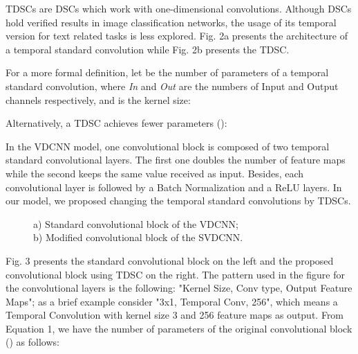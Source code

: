 \documentclass[conference]{IEEEtran}
\begin{document}
\newpage

TDSCs are DSCs which work with one-dimensional convolutions. Although DSCs hold verified results in image classification networks, the usage of its temporal version for text related tasks is less explored. Fig. 2a presents the architecture of a temporal standard convolution while Fig. 2b presents the TDSC.

For a more formal definition, let   be the number of parameters of a temporal standard convolution, where  \textit{In} and \textit{Out} are the numbers of Input and Output channels respectively, and   is the kernel size:



Alternatively, a TDSC achieves fewer parameters (): 



In the VDCNN model, one convolutional block is composed of two temporal standard convolutional layers. The first one doubles the number of feature maps while the second keeps the same value received as input. Besides, each convolutional layer is followed by a Batch Normalization and a ReLU layers. In our model, we proposed changing the temporal standard convolutions by TDSCs.

\begin{figure}[htbp]
\begin{minipage}[t]{.5\linewidth}
\centering
{}
\end{minipage}\begin{minipage}[t]{.5\linewidth}
\centering
{}
\end{minipage}
\caption{a) Standard convolutional block of the VDCNN;\\b) Modified convolutional block of the SVDCNN.}
\label{fig:main}
\end{figure}

Fig. 3 presents the standard convolutional block on the left and the proposed convolutional block using TDSC on the right. The pattern used in the figure for the convolutional layers is the following: "Kernel Size, Conv type, Output  Feature Maps"; as a brief example consider "3x1, Temporal Conv, 256", which means a Temporal Convolution with kernel size 3 and 256 feature maps as output. From Equation 1, we have the number of parameters of the original convolutional block  () as follows:
\end{document}
